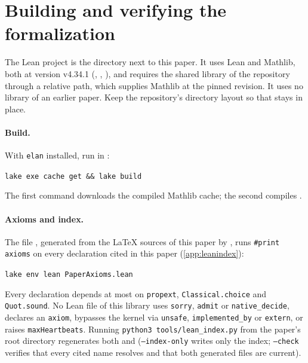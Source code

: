 \section{Building and verifying the formalization}\label{app:verification}

The Lean project is the directory  next to this paper. It uses Lean and Mathlib, both at version v4.34.1
(, , ), and requires the shared
 library of the repository through a relative path, which supplies Mathlib at the pinned
revision. It uses no library of an earlier paper. Keep the repository's directory layout so that
 stays in place.

\paragraph{Build.} With \texttt{elan} installed, run in :
\begin{center}
\texttt{lake exe cache get \&\& lake build}
\end{center}
The first command downloads the compiled Mathlib cache; the second compiles .

\paragraph{Axioms and index.} The file , generated from the \LaTeX{} sources of this paper
by , runs \texttt{\#print axioms} on every declaration cited in this paper
(\cref{app:leanindex}):
\begin{center}
\texttt{lake env lean PaperAxioms.lean}
\end{center}
Every declaration depends at most on \texttt{propext}, \texttt{Classical.choice} and \texttt{Quot.sound}. No Lean file
of this library uses \texttt{sorry}, \texttt{admit} or \texttt{native\_decide}, declares an \texttt{axiom}, bypasses the
kernel via \texttt{unsafe}, \texttt{implemented\_by} or \texttt{extern}, or raises \texttt{maxHeartbeats}. Running
\texttt{python3 tools/lean\_index.py} from the paper's root directory regenerates both
 and  (\texttt{--index-only} writes only the
index; \texttt{--check} verifies that every cited name resolves and that both generated files are current).

